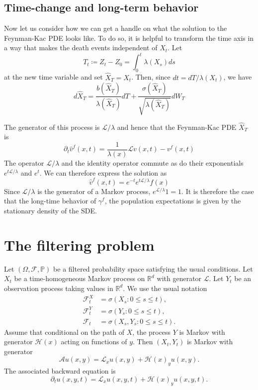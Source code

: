 \documentclass[11pt]{article}
\begin{document}
\subsection*{Time-change and long-term behavior}
Now let us consider how we can get a handle on what the solution to the Feynman-Kac PDE looks like. To do so, it is helpful to transform the time axis in a way that makes the death events independent of $X_t$. Let
\begin{equation}
T_t \coloneqq Z_t - Z_0  = \int_0^t\lambda(X_s)ds
\end{equation}
at the new time variable and set $\hat{X}_T = X_t$. Then, since $dt = dT/\lambda(X_t)$, we have
\begin{equation}\label{eq:Xtil}
d\hat{X}_T = \frac{b(\hat{X}_T)}{\lambda(\hat{X}_T)}dT + \frac{\sigma(\hat{X}_T)}{\sqrt{\lambda(\hat{X}_T)}}dW_T
\end{equation}

The generator of this process is ${\mathcal L}/\lambda$ and hence that the Feynman-Kac PDE $\hat{X}_T$ is 
\begin{equation}
\partial_t \hat{v}^f(x,t) = \frac{1}{\lambda(x)} {\mathcal L}v(x,t) -v^f(x,t)
\end{equation}
The operator ${\mathcal L}/\lambda$ and the identity operator commute as do their exponentials $e^{t{\mathcal L}/\lambda}$ and $e^t$. We can therefore express the solution as 
\begin{equation}
\hat{v}^f(x,t) = e^{-t}e^{t{\mathcal L}/\lambda}f(x)
\end{equation}
Since ${\mathcal L}/\lambda$ is the generator of a Markov process, $e^{{\mathcal L}/\lambda} 1 = 1$. It is therefore the case that the long-time behavior of $\gamma^f$, the population expectations is given by the stationary density of the SDE.  




\section*{The filtering problem}

Let $(\Omega,\mathcal F,\mathbb P)$ be a filtered probability space satisfying the usual conditions.  
Let $X_t$ be a time-homogeneous Markov process on $\mathbb R^d$ with generator $\mathcal L$.  
Let $Y_t$ be an observation process taking values in $\mathbb R^d$. We use the usual notation 
\begin{align}
\mathcal F_t^X &= \sigma(X_s:0\le s\le t), \\
\mathcal F_t^Y &= \sigma(Y_s:0\le s\le t), \\
\mathcal F_t &= \sigma(X_s,Y_s:0\le s\le t).
\end{align}
Assume that conditional on the path of $X$, the process $Y$ is Markov with generator $\mathcal H(x)$ acting on functions of $y$.  
Then $(X_t,Y_t)$ is Markov with generator
\begin{equation}
\mathcal A u(x,y)
=
\mathcal L_x u(x,y)
+
\mathcal H(x)_y u(x,y).
\end{equation}
The associated backward equation is
\begin{equation}
\partial_t u(x,y,t)
=
\mathcal L_x u(x,y,t)
+
\mathcal H(x)_y u(x,y,t).
\end{equation}
\end{document}
